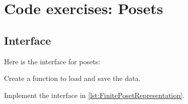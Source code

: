 
\section{\usebox{\chaptergear}
  Code exercises: Posets}

\begin{figure}

    \caption{}
    \label{fig:poset-finiteposet}
\end{figure}

\subsection*{Interface}

Here is the interface for posets:


%



\begin{codeexercise}
    Create a function to load and save the data.

    Implement the interface in \cref{lst:FinitePosetRepresentation}.
\end{codeexercise}



